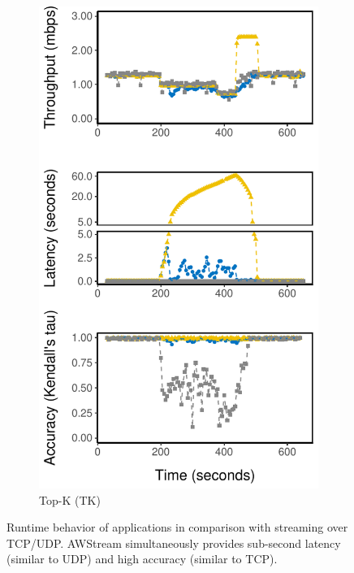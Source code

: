 \begin{figure}
\begin{subfigure}{0.3\textwidth}
    \includegraphics[width=\textwidth]{figures/runtime-topk-verticle.pdf}
    \caption{Top-K (TK)}
    \label{fig:tk-runtime}
  \end{subfigure}
  \caption{Runtime behavior of \sysname{} applications in comparison with
    streaming over TCP/UDP\@. AWStream simultaneously provides sub-second
    latency (similar to UDP) and high accuracy (similar to TCP).}
  \label{fig:all-runtime}
\end{figure}

